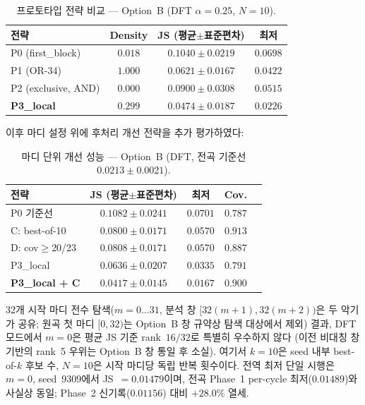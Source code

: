 \documentclass[conference,10pt,a4paper]{IEEEtran}
\begin{document}
\begin{table}[t]
\centering
\caption{프로토타입 전략 비교 — Option~B (DFT $\alpha=0.25$, $N=10$).}
\label{tab:module_proto}
\begin{tabular}{lccc}
\toprule
전략 & Density & JS (평균$\pm$표준편차) & 최저 \\
\midrule
P0 (first\_block) & $0.018$ & $0.1040 \pm 0.0219$ & $0.0698$ \\
P1 (OR-34) & $1.000$ & $0.0621 \pm 0.0167$ & $0.0422$ \\
P2 (exclusive, AND) & $0.000$ & $0.0900 \pm 0.0308$ & $0.0515$ \\
\textbf{P3\_local} & \textbf{$0.299$} & \textbf{$0.0474 \pm 0.0187$} & \textbf{$0.0226$} \\
\bottomrule
\end{tabular}
\end{table}

이후 마디 설정 위에 후처리 개선 전략을 추가 평가하였다:

\begin{table}[t]
\centering
\caption{마디 단위 개선 성능 — Option~B (DFT, 전곡 기준선
$0.0213 \pm 0.0021$).}
\label{tab:module}
\begin{tabular}{lcccc}
\toprule
전략 & JS (평균$\pm$표준편차) & 최저 & Cov. \\
\midrule
P0 기준선       & $0.1082 \pm 0.0241$ & $0.0701$ & $0.787$ \\
C: best-of-10   & $0.0800 \pm 0.0171$ & $0.0570$ & $0.913$ \\
D: cov$\ge$20/23 & $0.0808 \pm 0.0171$ & $0.0570$ & $0.887$ \\
P3\_local       & $0.0636 \pm 0.0207$ & $0.0335$ & $0.791$ \\
\textbf{P3\_local + C} & $\mathbf{0.0417 \pm 0.0145}$ & $\mathbf{0.0167}$ & $0.900$ \\
\bottomrule
\end{tabular}
\end{table}

32개 시작 마디 전수 탐색($m=0\ldots31$, 분석 창 $[32(m+1),32(m+2))$은
두 악기가 공유; 원곡 첫 마디 $[0,32)$는 Option~B 창 규약상 탐색 대상에서 제외)
결과, DFT 모드에서 $m=0$은 평균 JS 기준 rank~$16/32$로 특별히 우수하지 않다
(이전 비대칭 창 기반의 rank~5 우위는 Option~B 창 통일 후 소실).
여기서 $k=10$은 seed 내부 best-of-$k$ 후보 수, $N=10$은 시작 마디당
독립 반복 횟수이다. 전역 최저 단일 시행은 $m=0$, seed~9309에서
JS~$=0.01479$이며,
전곡 Phase~1 per-cycle 최저($0.01489$)와 사실상 동일; Phase~2 신기록($0.01156$) 대비 $+28.0\%$ 열세.
\end{document}
